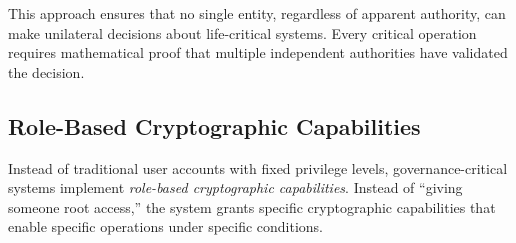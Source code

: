 This approach ensures that no single entity, regardless of apparent authority, can make unilateral decisions about life-critical systems. Every critical operation requires mathematical proof that multiple independent authorities have validated the decision.

\subsection{Role-Based Cryptographic Capabilities}

Instead of traditional user accounts with fixed privilege levels, governance-critical systems implement \textit{role-based cryptographic capabilities}. Instead of ``giving someone root access,'' the system grants specific cryptographic capabilities that enable specific operations under specific conditions.

